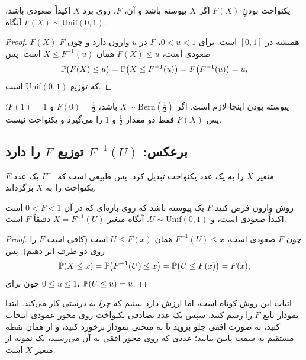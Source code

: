 \begin{proposition}[label=prop:pit]{یکنواخت بودنِ $F(X)$}
اگر $X$ پیوسته باشد و  آن، $F$، روی برد $X$ اکیداً صعودی باشد، آنگاه $F(X)\sim\mathrm{Unif}(0,1)$.
\end{proposition}

\begin{proof}
$F(X)$ همیشه در $[0,1]$ است. برای $0<u<1$، $F$ در $u$ وارون دارد و چون $F$ صعودی است، $F(X)\le u$ همان $X\le F^{-1}(u)$ است. پس
\[ \P\bigl(F(X)\le u\bigr)=\P\bigl(X\le F^{-1}(u)\bigr)=F\bigl(F^{-1}(u)\bigr)=u, \]
که  توزیع $\mathrm{Unif}(0,1)$ است.
\end{proof}

پیوسته بودن اینجا لازم است. اگر $X\sim\mathrm{Bern}(\tfrac12)$ باشد، $F(0)=\tfrac12$ و $F(1)=1$؛ پس $F(X)$ فقط دو مقدار $\tfrac12$ و $1$ را می‌گیرد و یکنواخت نیست.

\subsection{برعکس: $F^{-1}(U)$ توزیع $F$ را دارد}

$F$ متغیر $X$ را به یک عدد یکنواخت تبدیل کرد. پس طبیعی است که $F^{-1}$ یک عدد یکنواخت را به $X$ برگرداند.

\begin{theorem}[label=thm:inverse]{روش  وارون}
فرض کنید $F$ یک  پیوسته باشد که روی بازه‌ای که در آن $0<F<1$ است اکیداً صعودی است، و $U\sim\mathrm{Unif}(0,1)$. آنگاه  متغیر $X=F^{-1}(U)$ دقیقاً $F$ است.
\end{theorem}

\begin{proof}
چون $F$ صعودی است، $F^{-1}(U)\le x$ همان $U\le F(x)$ است (کافی است $F$ را روی دو طرف اثر دهیم). پس
\[ \P(X\le x)=\P\bigl(F^{-1}(U)\le x\bigr)=\P\bigl(U\le F(x)\bigr)=F(x), \]
چون برای $0\le u\le1$، $\P(U\le u)=u$.
\end{proof}

اثبات این روش کوتاه است، اما ارزش دارد ببینیم که \emph{چرا} به درستی کار می‌کند. ابتدا نمودار تابع $F$ را رسم کنید. سپس یک عدد تصادفی یکنواخت روی محور عمودی انتخاب کنید، به صورت افقی جلو بروید تا به منحنی نمودار برخورد کنید، و از همان نقطه مستقیم به سمت پایین بیایید؛ عددی که روی محور افقی به آن می‌رسید، یک نمونه از متغیر $X$ است.

